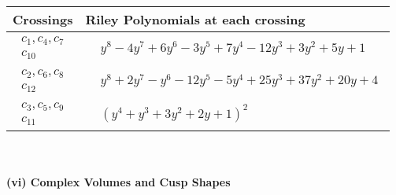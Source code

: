 \documentclass[1p]{elsarticle_modified}
\theoremstyle{definition}
\begin{document}
\begin{tabular}{m{50pt}|m{274pt}}
Crossings & \hspace{64pt}Riley Polynomials at each crossing \\
\hline $$\begin{aligned}c_{1},c_{4},c_{7}\\c_{10}\end{aligned}$$&$\begin{aligned}
&y^8-4 y^7+6 y^6-3 y^5+7 y^4-12 y^3+3 y^2+5 y+1
\end{aligned}$\\
\hline $$\begin{aligned}c_{2},c_{6},c_{8}\\c_{12}\end{aligned}$$&$\begin{aligned}
&y^8+2 y^7- y^6-12 y^5-5 y^4+25 y^3+37 y^2+20 y+4
\end{aligned}$\\
\hline $$\begin{aligned}c_{3},c_{5},c_{9}\\c_{11}\end{aligned}$$&$\begin{aligned}
&(y^4+y^3+3 y^2+2 y+1)^2
\end{aligned}$\\
\hline
\end{tabular}\\~\\
\newpage\flushleft \textbf{(vi) Complex Volumes and Cusp Shapes}
\end{document}
